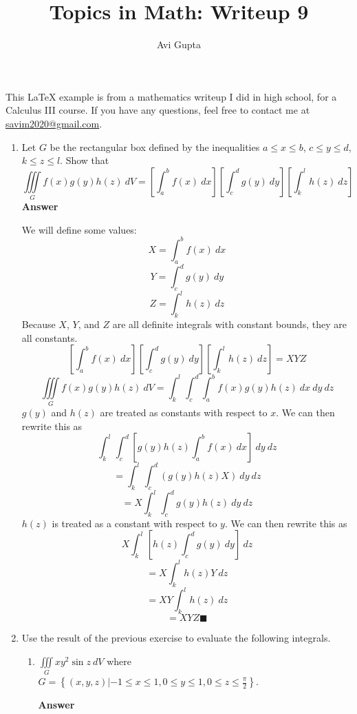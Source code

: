\documentclass[12pt, letterpaper]{article}
\title{Topics in Math: Writeup 9}
\author{Avi Gupta}
\date{}
\begin{document}
\pagestyle{fancy}
\fancyhf{}

This {\LaTeX} example is from a mathematics writeup I did in high school,
for a Calculus III course. If you have any questions, feel free
to contact me at {\href{mailto:savim2020@gmail.com}{savim2020@gmail.com}}.

\begin{enumerate}
    \item Let $G$ be the rectangular box defined by the inequalities
    $a \le x \le b$,
    $c \le y \le d$,
    $k \le z \le l$.
    Show that
    \[\iiint\limits_G f(x)g(y)h(z)\ dV =
    \left[\int_a^b f(x)\ dx\right]
    \left[\int_c^d g(y)\ dy\right]
    \left[\int_k^l h(z)\ dz\right]
    \]
    \textbf{Answer}

    We will define some values:
    \[X = \int_a^b f(x)\ dx\]
    \[Y = \int_c^d g(y)\ dy\]
    \[Z = \int_k^l h(z)\ dz\]
    Because $X$, $Y$, and $Z$ are all definite integrals with constant bounds,
    they are all constants.
    \[
    \left[\int_a^b f(x)\ dx\right]
    \left[\int_c^d g(y)\ dy\right]
    \left[\int_k^l h(z)\ dz\right]= XYZ\]
    \[\iiint\limits_G f(x)g(y)h(z)\ dV = \int_k^l \int_c^d \int_a^b f(x)g(y)h(z)\ dx\ dy\ dz\]
    $g(y)$ and $h(z)$ are treated as constants with respect to $x$. We can then rewrite this as
    \[\int_k^l \int_c^d \left[g(y)h(z) \int_a^b f(x)\ dx\right]\ dy\ dz\]
    \[ = \int_k^l \int_c^d \left(g(y)h(z) X\right)\ dy\ dz\]
    \[ = X \int_k^l \int_c^d g(y)h(z)\ dy\ dz\]
    $h(z)$ is treated as a constant with respect to $y$. We can then rewrite this as
    \[X \int_k^l \left[h(z) \int_{c}^{d} g(y)\ dy\right]\ dz\]
    \[= X \int_k^l  h(z) Y\ dz\]
    \[= XY \int_k^l  h(z) \ dz\]
    \[= XYZ \blacksquare\]

    \item Use the result of the previous exercise to evaluate the following integrals.
      \begin{enumerate}
        \item $\displaystyle \iiint\limits_G xy^2 \sin z\ dV$
        where $\displaystyle G = \left\{(x, y, z) |
        -1 \le x \le 1,
        0 \le y \le 1,
        0 \le z \le \frac{\pi}{2}\right\}$.

        \textbf{Answer}


\end{enumerate}
\end{enumerate}
\end{document}

